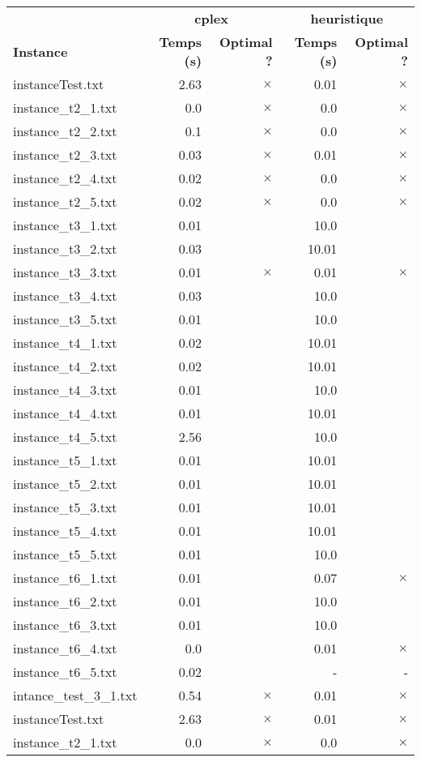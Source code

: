 \documentclass{article}
\begin{document}
\begin{center}
\renewcommand{\arraystretch}{1.4} 
 \begin{tabular}{lrrrr}
	\hline
 & \multicolumn{2}{c}{\textbf{cplex}} & \multicolumn{2}{c}{\textbf{heuristique}}\\
\textbf{Instance}  & \textbf{Temps (s)} & \textbf{Optimal ?}  & \textbf{Temps (s)} & \textbf{Optimal ?} \\\hline

instanceTest.txt & 2.63 & 
$\times$
 & 0.01 & 
$\times$
\\
instance\_t2\_1.txt & 0.0 & 
$\times$
 & 0.0 & 
$\times$
\\
instance\_t2\_2.txt & 0.1 & 
$\times$
 & 0.0 & 
$\times$
\\
instance\_t2\_3.txt & 0.03 & 
$\times$
 & 0.01 & 
$\times$
\\
instance\_t2\_4.txt & 0.02 & 
$\times$
 & 0.0 & 
$\times$
\\
instance\_t2\_5.txt & 0.02 & 
$\times$
 & 0.0 & 
$\times$
\\
instance\_t3\_1.txt & 0.01 & 
 & 10.0 & 
\\
instance\_t3\_2.txt & 0.03 & 
 & 10.01 & 
\\
instance\_t3\_3.txt & 0.01 & 
$\times$
 & 0.01 & 
$\times$
\\
instance\_t3\_4.txt & 0.03 & 
 & 10.0 & 
\\
instance\_t3\_5.txt & 0.01 & 
 & 10.0 & 
\\
instance\_t4\_1.txt & 0.02 & 
 & 10.01 & 
\\
instance\_t4\_2.txt & 0.02 & 
 & 10.01 & 
\\
instance\_t4\_3.txt & 0.01 & 
 & 10.0 & 
\\
instance\_t4\_4.txt & 0.01 & 
 & 10.01 & 
\\
instance\_t4\_5.txt & 2.56 & 
 & 10.0 & 
\\
instance\_t5\_1.txt & 0.01 & 
 & 10.01 & 
\\
instance\_t5\_2.txt & 0.01 & 
 & 10.01 & 
\\
instance\_t5\_3.txt & 0.01 & 
 & 10.01 & 
\\
instance\_t5\_4.txt & 0.01 & 
 & 10.01 & 
\\
instance\_t5\_5.txt & 0.01 & 
 & 10.0 & 
\\
instance\_t6\_1.txt & 0.01 & 
 & 0.07 & 
$\times$
\\
instance\_t6\_2.txt & 0.01 & 
 & 10.0 & 
\\
instance\_t6\_3.txt & 0.01 & 
 & 10.0 & 
\\
instance\_t6\_4.txt & 0.0 & 
 & 0.01 & 
$\times$
\\
instance\_t6\_5.txt & 0.02 & 
 & - & - 
\\
intance\_test\_3\_1.txt & 0.54 & 
$\times$
 & 0.01 & 
$\times$
\\
instanceTest.txt & 2.63 & 
$\times$
 & 0.01 & 
$\times$
\\
instance\_t2\_1.txt & 0.0 & 
$\times$
 & 0.0 & 
$\times$
\\
\hline\end{tabular}
\end{center}
\end{document}
